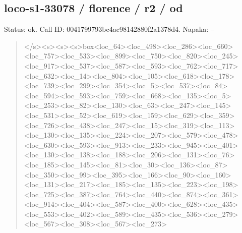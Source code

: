 \documentclass[10pt,a4paper]{article}
\begin{document}
\subsection*{loco-s1-33078 / florence / r2 / od}
Status: ok. Call ID: 0041799793bc4ac98142880f2a1378d4. Napaka: --
\begin{quote}\footnotesize
</s>\allowbreak{}<s>\allowbreak{}<s>\allowbreak{}<s>\allowbreak{}box<loc\_64>\allowbreak{}<loc\_498\allowbreak{}>\allowbreak{}<loc\_286>\allowbreak{}<loc\_660>\allowbreak{}<loc\_757>\allowbreak{}<loc\allowbreak{}\_533>\allowbreak{}<loc\_899>\allowbreak{}<loc\_750>\allowbreak{}<loc\_820>\allowbreak{}\allowbreak{}<loc\_245>\allowbreak{}<loc\_917>\allowbreak{}<loc\_537>\allowbreak{}<loc\_\allowbreak{}587>\allowbreak{}<loc\_593>\allowbreak{}<loc\_762>\allowbreak{}<loc\_717>\allowbreak{}<\allowbreak{}loc\_632>\allowbreak{}<loc\_14>\allowbreak{}<loc\_804>\allowbreak{}<loc\_10\allowbreak{}5>\allowbreak{}<loc\_618>\allowbreak{}<loc\_178>\allowbreak{}<loc\_739>\allowbreak{}<lo\allowbreak{}c\_299>\allowbreak{}<loc\_354>\allowbreak{}<loc\_5>\allowbreak{}<loc\_537>\allowbreak{}<\allowbreak{}loc\_84>\allowbreak{}<loc\_594>\allowbreak{}<loc\_593>\allowbreak{}<loc\_75\allowbreak{}9>\allowbreak{}<loc\_668>\allowbreak{}<loc\_135>\allowbreak{}<loc\_5>\allowbreak{}<loc\_\allowbreak{}253>\allowbreak{}<loc\_82>\allowbreak{}<loc\_130>\allowbreak{}<loc\_63>\allowbreak{}<lo\allowbreak{}c\_247>\allowbreak{}<loc\_145>\allowbreak{}<loc\_531>\allowbreak{}<loc\_52>\allowbreak{}\allowbreak{}<loc\_619>\allowbreak{}<loc\_159>\allowbreak{}<loc\_629>\allowbreak{}<loc\_\allowbreak{}359>\allowbreak{}<loc\_726>\allowbreak{}<loc\_438>\allowbreak{}<loc\_247>\allowbreak{}<\allowbreak{}loc\_15>\allowbreak{}<loc\_319>\allowbreak{}<loc\_113>\allowbreak{}<loc\_13\allowbreak{}0>\allowbreak{}<loc\_135>\allowbreak{}<loc\_224>\allowbreak{}<loc\_207>\allowbreak{}<lo\allowbreak{}c\_579>\allowbreak{}<loc\_478>\allowbreak{}<loc\_630>\allowbreak{}<loc\_593\allowbreak{}>\allowbreak{}<loc\_913>\allowbreak{}<loc\_233>\allowbreak{}<loc\_945>\allowbreak{}<loc\allowbreak{}\_401>\allowbreak{}<loc\_130>\allowbreak{}<loc\_138>\allowbreak{}<loc\_188>\allowbreak{}\allowbreak{}<loc\_206>\allowbreak{}<loc\_131>\allowbreak{}<loc\_76>\allowbreak{}<loc\_1\allowbreak{}85>\allowbreak{}<loc\_145>\allowbreak{}<loc\_81>\allowbreak{}<loc\_30>\allowbreak{}<loc\allowbreak{}\_136>\allowbreak{}<loc\_87>\allowbreak{}<loc\_350>\allowbreak{}<loc\_99>\allowbreak{}<l\allowbreak{}oc\_395>\allowbreak{}<loc\_166>\allowbreak{}<loc\_90>\allowbreak{}<loc\_160\allowbreak{}>\allowbreak{}<loc\_131>\allowbreak{}<loc\_217>\allowbreak{}<loc\_185>\allowbreak{}<loc\allowbreak{}\_135>\allowbreak{}<loc\_223>\allowbreak{}<loc\_198>\allowbreak{}<loc\_725>\allowbreak{}\allowbreak{}<loc\_387>\allowbreak{}<loc\_764>\allowbreak{}<loc\_440>\allowbreak{}<loc\_\allowbreak{}874>\allowbreak{}<loc\_361>\allowbreak{}<loc\_914>\allowbreak{}<loc\_404>\allowbreak{}<\allowbreak{}loc\_587>\allowbreak{}<loc\_400>\allowbreak{}<loc\_628>\allowbreak{}<loc\_4\allowbreak{}35>\allowbreak{}<loc\_553>\allowbreak{}<loc\_402>\allowbreak{}<loc\_589>\allowbreak{}<l\allowbreak{}oc\_435>\allowbreak{}<loc\_536>\allowbreak{}<loc\_279>\allowbreak{}<loc\_56\allowbreak{}7>\allowbreak{}<loc\_308>\allowbreak{}<loc\_567>\allowbreak{}<loc\_273>\allowbr
\end{quote}
\end{document}

